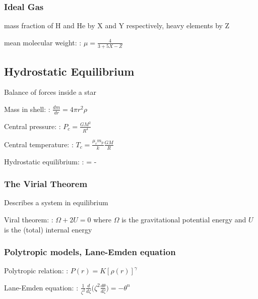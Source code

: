 \documentclass[a4paper, 11pt, landscape]{article}
\begin{document}
\begin{multicols*}{3}
\subsubsection{Ideal Gas}
\begin{compactenum}
	\item mass fraction of H and He by X and Y respectively, heavy elements by Z
	\item [\color{red}mean molecular weight:]: $\mu = \frac{4}{3 + 5X - Z}$
\end{compactenum}

\subsection{Hydrostatic Equilibrium}
Balance of forces inside a star
\begin{compactenum}
	\item [\color{red}Mass in shell:]: $\frac{dm}{dr} = 4\pi r^{2}\rho$
	\item [\color{red}Central pressure:]: $P_{c} = \frac{GM^{2}}{R^{4}}$
	\item [\color{red}Central temperature:]: $T_{c} = \frac{\mu_{c} m_{p}}{k} \frac{GM}{R}$
	\item [\color{red}Hydrostatic equilibrium:]:  = -\rho {}
\end{compactenum}

\subsubsection{The Virial Theorem}
Describes a system in equilibrium
\begin{compactenum}
	\item [\color{red}Viral theorem:]: $\Omega + 2U = 0$ where $\Omega$ is the gravitational potential energy and $U$ is the (total) internal energy
\end{compactenum}

\subsubsection{Polytropic models, Lane-Emden equation}
\begin{compactenum}
    \item [\color{red}Polytropic relation:]: $P(r) = K[\rho(r)]^{\gamma}$
	\item [\color{red}Lane-Emden equation:]: $\frac{1}{\zeta^{2}} \frac{d}{d \zeta} \Big( \zeta^{2} \frac{d \theta}{d \zeta} \Big) = -\theta^{n}$
\end{compactenum}


\end{multicols*}
\end{document}
